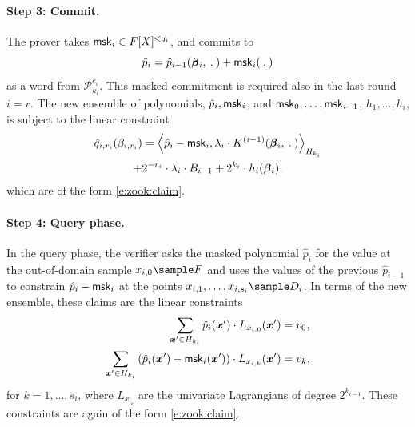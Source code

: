 \paragraph{Step 3: Commit.}
The prover takes $\mathsf{msk}_{i}\in F[X]^{<q_i}$, and commits to %
\[
\hat p_i = \hat p_{i-1}(\vec\beta_{i},\:.\:) + \msk_i(\:.\:)
\]
as a word from $\mathscr P_{k_{i}}^{e_i}$.
This masked commitment is required also in the last round $i=r$. 
The new ensemble of polynomials, $\hat p_i, \mathsf{msk}_i$, and $\mathsf{msk}_0,\ldots, \mathsf{msk}_{i-1}$, $h_1,\ldots, h_i$, is subject to the linear constraint
\begin{multline}
\label{e:zook:specialized:claim}
\hat q_{i,r_i}(\beta_{i,r_i}) = 
\left\langle \hat p_i - \msk_i,  \lambda_i\cdot K^{(i-1)}(\vec\beta_i, \:.\:) \right\rangle_{H_{k_i}} 
\\
+ 2^{-r_i} \cdot \lambda_i \cdot B_{i-1} + 2^{k_i}\cdot h_i(\vec\beta_i),
\end{multline}
which are of the form \eqref{e:zook:claim}.

\paragraph{Step 4: Query phase.}
In the query phase, the verifier asks the masked polynomial $\hat p_i$ for the value at the out-of-domain sample $x_{i,0}\sample F$ and uses the values of the previous $\hat p_{i-1}$ to constrain $\hat p_i - \mathsf{msk}_i$ at the points $x_{i,1},\ldots, x_{i,s_i}\sample D_i$.
In terms of the new ensemble, these claims are the linear constraints 
\begin{align}
\label{e:zook:out:domain:constraint}
\sum_{\vec x' \in H_{k_i}} \hat p_i(\vec x') \cdot L_{x_{i,0}}(\vec x') &= v_0,
\\
\label{e:zook:in:domain:constraint}
\sum_{\vec x'\in H_{k_i}} \left(\hat p_i(\vec x') - \msk_{i}(\vec x')\right)\cdot L_{x_{i,k}}(\vec x') &= v_{k},
\end{align}
for $k= 1,\ldots, s_i$, where $L_{x_{i_k}}$ are the univariate Lagrangians of degree $2^{k_{i-1}}$. 
These constraints are again of the form \eqref{e:zook:claim}.







